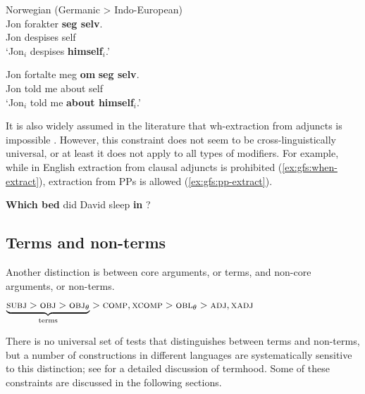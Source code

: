 \documentclass[output=paper]{../langscibook}
\begin{document}
 \ea\label{ex:gfs:norw} Norwegian (Germanic > Indo-European)\\
 \ea
    \gll Jon forakter \textbf{seg selv}.\\
    Jon despises self\\
    \glt `Jon$_i$ despises \textbf{himself}$_i$.'
    
    \ex
    \gll Jon fortalte meg \textbf{om} \textbf{seg selv}.\\
    Jon told me about self\\
    \glt `Jon$_i$ told me \textbf{about himself}$_i$.'
    
    \z
 \z
 
 It is also widely assumed in the literature that wh-extraction from adjuncts is impossible \citep{pollardsag87,huang82,rizzi1990}. However, this constraint does not seem to be cross-linguistically universal, or at least it does not apply to all types of modifiers. For example, while in English extraction from clausal adjuncts is prohibited (\ref{ex:gfs:when-extract}), extraction from PPs is allowed (\ref{ex:gfs:pp-extract}).
 
    \ex\label{ex:gfs:pp-extract} \textbf{Which bed} did David sleep \textbf{in} {\GAP}?
 \z
 
 \subsection{Terms and non-terms\label{sect:gfs:terms}}
 
 Another distinction is between core arguments, or terms, and non-core arguments, or non-terms.
 
 \ea\label{ex:gfs:terms}
 $\underbrace{\textsc{subj}{} > \textsc{obj}{} > {\mbox{\textsc{obj}$_{\theta}$}{}}}_{\text{terms}} > \textsc{comp}{}, \textsc{xcomp}{} > {\mbox{\textsc{obl}$_{\theta}$}{}} > \textsc{adj}{}, \textsc{xadj}$
 \z
 
 There is no universal set of tests that distinguishes between terms and non-terms, but a number of constructions in different languages are systematically sensitive to this distinction; see \citet{Alsina:PhD} for a detailed discussion of termhood. Some of these constraints are discussed in the following sections.
 
\end{document}
